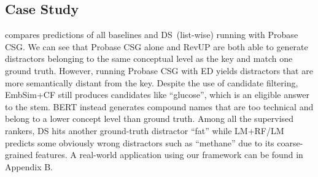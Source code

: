 \subsection{Case Study}

 compares predictions of all baselines and DS~(list-wise) running with Probase CSG. We can see that Probase CSG alone and RevUP are both able to generate distractors belonging to the same conceptual level as the key and match one ground truth. However, running Probase CSG with ED yields 
distractors that are more semantically distant from the key. 
Despite the use of candidate filtering, EmbSim+CF still produces candidates 
like ``glucose'', which is an eligible answer to the stem. 
BERT instead generates compound names that are too technical and belong to a lower concept level than ground truth. 
Among all the supervised rankers, DS hits another ground-truth distractor 
``fat'' while LM+RF/LM predicts some obviously wrong distractors 
such as ``methane'' due to its coarse-grained features. A real-world application using our framework can be found in Appendix B.


